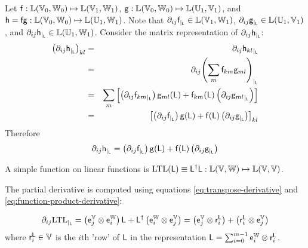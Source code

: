 \label{sec:Derivatives-of-function-products}

Let
$\mathsf{f} : \mathbb{L}(\mathbb{V}_0,\mathbb{W}_0) \mapsto \mathbb{L}(\mathbb{V}_1,\mathbb{W}_1)$,
$\mathsf{g} : \mathbb{L}(\mathbb{V}_0,\mathbb{W}_0) \mapsto \mathbb{L}(\mathbb{U}_1,\mathbb{V}_1)$,
and
$\mathsf{h} = \mathsf{f}\mathsf{g} : \mathbb{L}(\mathbb{V}_0,\mathbb{W}_0) \mapsto \mathbb{L}(\mathbb{U}_1,\mathbb{W}_1)$.
Note that
${\partial}_{ij}{\mathsf{f}}_{\mid_{\mathsf{L}}} \in  \mathbb{L}(\mathbb{V}_1,\mathbb{W}_1)$,
${\partial}_{ij}{\mathsf{g}}_{\mid_{\mathsf{L}}} \in  \mathbb{L}(\mathbb{U}_1,\mathbb{V}_1)$,
and
${\partial}_{ij}{\mathsf{h}}_{\mid_{\mathsf{L}}} \in  \mathbb{L}(\mathbb{U}_1,\mathbb{W}_1)$.
Consider the matrix representation of ${\partial}_{ij}{\mathsf{h}}_{\mid_{\mathsf{L}}}$:
\begin{eqnarray}
\left( {\partial}_{ij}{\mathsf{h}}_{\mid_{\mathsf{L}}} \right)_{kl}
& = &
{\partial}_{ij}{\mathsf{h}_{kl}}_{\mid_{\mathsf{L}}}
\\
& = &
{\partial}_{ij}{\left( \sum_{m} \mathsf{f}_{km} \mathsf{g}_{ml} \right)}_{\mid_{\mathsf{L}}}
\nonumber
\\
& = &
\sum_{m}  \left[
\left( {\partial}_{ij}{\mathsf{f}_{km}}_{\mid_{\mathsf{L}}} \right) \mathsf{g}_{ml}(\mathsf{L})
+
\mathsf{f}_{km}(\mathsf{L}) \left( {\partial}_{ij}{\mathsf{g}_{ml}}_{\mid_{\mathsf{L}}} \right)
\right]
\nonumber
\\
& = &
\left[
\left( {\partial}_{ij}{\mathsf{f}}_{\mid_{\mathsf{L}}} \right) \mathsf{g}(\mathsf{L})
+
\mathsf{f}(\mathsf{L}) \left( {\partial}_{ij}{\mathsf{g}}_{\mid_{\mathsf{L}}} \right)
\right]_{kl}
\nonumber
\end{eqnarray}
Therefore
\begin{equation}
\label{eq:function-product-derivative}
{\partial}_{ij}{\mathsf{h}}_{\mid_{\mathsf{L}}}
 =
\left( {\partial}_{ij}{\mathsf{f}}_{\mid_{\mathsf{L}}} \right) \mathsf{g}(\mathsf{L})
+
\mathsf{f}(\mathsf{L}) \left( {\partial}_{ij}{\mathsf{g}}_{\mid_{\mathsf{L}}} \right)
\end{equation}

\levelstay{$\Lmap^{\dagger} \Lmap$}
\label{sec:Derivatives-of-LTL}

A simple function on linear functions
is $\mathrm{LTL}(\mathsf{L}) \equiv \mathsf{L}^{\dagger} \mathsf{L}
: \mathbb{L}(\mathbb{V},\mathbb{W}) \mapsto \mathbb{L}(\mathbb{V},\mathbb{V})$.

The partial derivative is computed using equations
\ref{eq:transpose-derivative}
and
\ref{eq:function-product-derivative}:

\begin{equation}
{\partial}_{ij}{\mathrm{LTL}}_{\mid_{\mathsf{L}}}
=
\left( \mathsf{e}_j^{\mathbb{V}} \otimes \mathsf{e}_i^{\mathbb{W}} \right) \mathsf{L}
+
\mathsf{L}^{\dagger} \left( \mathsf{e}_i^{\mathbb{W}} \otimes \mathsf{e}_j^{\mathbb{V}} \right)
=
\left( \mathsf{e}_j^{\mathbb{V}} \otimes \mathsf{r}_i^{\mathsf{L}} \right)
+
\left( \mathsf{r}_i^{\mathsf{L}} \otimes \mathsf{e}_j^{\mathbb{V}} \right)
\end{equation}
where $\mathsf{r}_i^{\mathsf{L}} \in \mathbb{V}$ is the $i$th 'row' of $\mathsf{L}$
in the representation $\mathsf{L} = \sum_{i=0}^{m-1} \mathsf{e}_i^{\mathbb{W}} \otimes \mathsf{r}_i^{\mathsf{L}}$.

